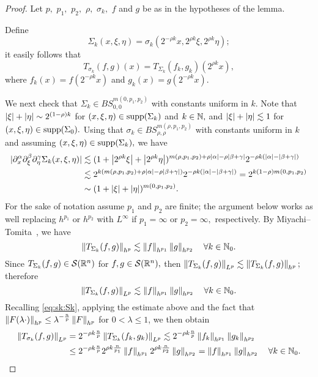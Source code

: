 \begin{proof} Let $p,$ $p_1,$ $p_2,$  $\rho,$  $\sigma_k,$ $f$ and $g$ be as in the hypotheses of the lemma.  

Define
\[
\Sigma_k(x,\xi,\eta)=\sigma_k(2^{-\rho k}x, 2^{\rho k}\xi, 2^{\rho k} \eta);
\]
it easily follows that 
\begin{equation}\label{eq:sk:Sk}
T_{\sigma_k}(f,g)(x)=T_{\Sigma_k} (f_k,g_k)(2^{\rho k}x),
\end{equation}
where $f_k(x)=f(2^{-\rho k}x)$ and $g_k(x)=g(2^{-\rho k}x).$ 

We next check that $\Sigma_k\in BS^{m(0,p_1,p_2)}_{0,0}$ with constants uniform in $k.$ Note that $\left\vert \xi \right\vert+\left\vert \eta \right\vert\sim 2^{(1-\rho)k}$ for $(x,\xi,\eta)\in {\rm{supp}}(\Sigma_k)$ and $k\in\mathbb{N},$ and $\left\vert \xi \right\vert+\left\vert \eta \right\vert\lesssim 1$ for $(x,\xi,\eta)\in {\rm{supp}}(\Sigma_0).$ Using that $\sigma_k\in BS^{m(\rho,p_1,p_2)}_{\rho,\rho}$ with constants uniform in $k$ and assuming $(x,\xi,\eta)\in {\rm{supp}}(\Sigma_k),$ we have  
\begin{align*}
|\partial_x^\alpha\partial^\beta_\xi\partial^\gamma_\eta \Sigma_k(x,\xi, \eta)|&\lesssim (1+\left\vert 2^{\rho k}\xi \right\vert+\left\vert 2^{\rho k}\eta \right\vert)^{m(\rho,p_1,p_2)+\rho\left\vert \alpha \right\vert-\rho\left\vert \beta+\gamma \right\vert}2^{-\rho k(\left\vert \alpha \right\vert-\left\vert \beta+\gamma \right\vert)}\\
&\lesssim 2^{k(m(\rho,p_1,p_2)+\rho\left\vert \alpha \right\vert-\rho\left\vert \beta+\gamma \right\vert)}2^{-\rho k(\left\vert \alpha \right\vert-\left\vert \beta+\gamma \right\vert)}=2^{k(1-\rho)m(0,p_1,p_2)}\\
&\sim (1+\left\vert \xi \right\vert+\left\vert \eta \right\vert)^{m(0,p_1,p_2)}.
\end{align*}
For the sake of notation assume $p_1$ and $p_2$ are finite; the argument below works as well replacing $h^{p_1}$ or $h^{p_2}$ with $L^\infty$ if $p_1=\infty$ or $p_2=\infty,$ respectively.  By Miyachi--Tomita~\cite[Theorem 1.1]{MR3179688}, we have  
\begin{equation*}
\left\|T_{\Sigma_k}(f,g)\right\|_{h^p}\lesssim \left\|f\right\|_{h^{p_1}}\left\|g\right\|_{h^{p_2}}\quad \forall k\in\mathbb{N}_0.
\end{equation*}
Since $T_{\Sigma_k}(f,g)\in {\mathcal{S}}({{\mathbb R}^n})$ for $f,g\in{\mathcal{S}}({{\mathbb R}^n}),$ then $\left\|T_{\Sigma_k}(f,g)\right\|_{L^p} \lesssim \left\|T_{\Sigma_k}(f,g)\right\|_{h^p};$ therefore
\begin{equation*}
\left\|T_{\Sigma_k}(f,g)\right\|_{L^p}\lesssim \left\|f\right\|_{h^{p_1}}\left\|g\right\|_{h^{p_2}}\quad \forall k\in\mathbb{N}_0.
\end{equation*}
Recalling \eqref{eq:sk:Sk}, applying the estimate above and the fact that $\left\|F(\lambda \cdot)\right\|_{h^p} \leq \lambda^{-\frac{n}{p}} \left\|F\right\|_{h^p}$ for $0<\lambda \leq 1$, we then obtain
\begin{align*}
\left\|T_{\sigma_k}(f,g)\right\|_{L^p}&=2^{-\rho k \frac{n}{p}}\left\|T_{\Sigma_k}(f_k,g_k)\right\|_{L^p}\lesssim 2^{-\rho k \frac{n}{p}} \left\|f_k\right\|_{h^{p_1}}\left\|g_k\right\|_{h^{p_2}}\\
&\le  2^{-\rho k \frac{n}{p}} 2^{\rho k \frac{n}{p_1}}\left\|f\right\|_{h^{p_1}} 2^{\rho k \frac{n}{p_2}}\left\|g\right\|_{h^{p_2}}=\left\|f\right\|_{h^{p_1}} \left\|g\right\|_{h^{p_2}} \quad \forall k\in\mathbb{N}_0. 
\end{align*}
\end{proof}




